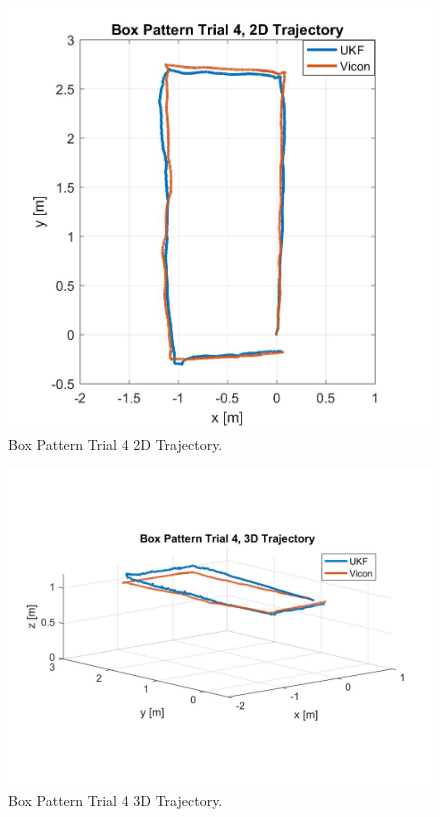 \begin{figure}[p]
  \centering
    \includegraphics[height=0.4\textheight]{box4_2d}
  \caption[Box Pattern Trial 4 2D Trajectory]{Box Pattern Trial 4 2D Trajectory.}
  \label{fig:box4_2d}
\end{figure}
\begin{figure}[p]
  \centering
    \includegraphics[height=0.4\textheight]{box4_3d}
  \caption[Box Pattern Trial 4 3D Trajectory]{Box Pattern Trial 4 3D Trajectory.}
  \label{fig:box4_3d}
\end{figure}
\clearpage

